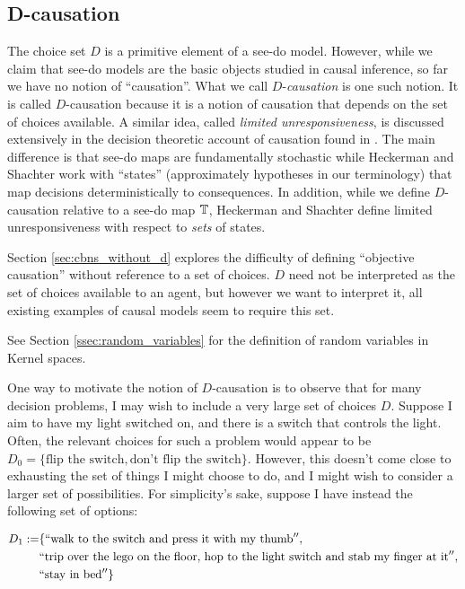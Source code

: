\subsection{D-causation}

The choice set $D$ is a primitive element of a see-do model. However, while we claim that see-do models are the basic objects studied in causal inference, so far we have no notion of ``causation''. What we call $D$-\emph{causation} is one such notion. It is called $D$-causation because it is a notion of causation that depends on the set of choices available. A similar idea, called \emph{limited unresponsiveness}, is discussed extensively in the decision theoretic account of causation found in \citet{heckerman_decision-theoretic_1995}. The main difference is that see-do maps are fundamentally stochastic while Heckerman and Shachter work with ``states'' (approximately hypotheses in our terminology) that map decisions deterministically to consequences. In addition, while we define $D$-causation relative to a see-do map $\mathbb{T}$, Heckerman and Shachter define limited unresponsiveness with respect to \emph{sets} of states.

Section \ref{sec:cbns_without_d} explores the difficulty of defining ``objective causation'' without reference to a set of choices. $D$ need not be interpreted as the set of choices available to an agent, but however we want to interpret it, all existing examples of causal models seem to require this set.

See Section \ref{ssec:random_variables} for the definition of random variables in Kernel spaces.

One way to motivate the notion of $D$-causation is to observe that for many decision problems, I may wish to include a very large set of choices $D$. Suppose I aim to have my light switched on, and there is a switch that controls the light. Often, the relevant choices for such a problem would appear to be $D_0=\{\text{flip the switch},\text{don't flip the switch}\}$. However, this doesn't come close to exhausting the set of things I might choose to do, and I might wish to consider a larger set of possibilities. For simplicity's sake, suppose I have instead the following set of options:

\begin{align*}
D_1:=&\{``\text{walk to the switch and press it with my thumb}'', \\
    &``\text{trip over the lego on the floor, hop to the light switch and stab my finger at it}'',\\
    &``\text{stay in bed}''\}
\end{align*}

